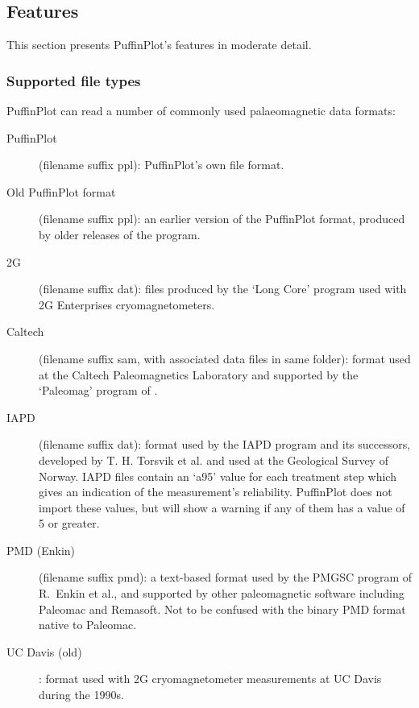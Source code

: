 \documentclass[a4paper,british]{article}
\newcommand{\ppcmd}[1]{\textsf{#1}} %
\newcommand{\caps}[1]{\MakeTextUppercase{#1}} %
\begin{document}
\subsection{Features}

This section presents PuffinPlot's features in moderate detail.

\subsubsection{\label{sec:file-types}Supported file types}

PuffinPlot can read a number of commonly used palaeomagnetic data
formats:

\begin{description}

\item[PuffinPlot] (filename suffix \ppcmd{ppl}): PuffinPlot's own file
  format.

\item[Old PuffinPlot format] (filename suffix \ppcmd{ppl}): an earlier
  version of the PuffinPlot format, produced by older releases of
  the program.

\item[2G] (filename suffix \ppcmd{dat}): files produced by the `Long
  Core' program used with 2G Enterprises cryomagnetometers.

\item[Caltech] (filename suffix \ppcmd{sam}, with associated data files
  in same folder): format used at the Caltech Paleomagnetics Laboratory
  and supported by the `Paleomag' program of \cite{jones2002paleomag}.

\item[IAPD] (filename suffix \ppcmd{dat}): format used by the
  \caps{iapd} program and its successors, developed by T. H. Torsvik et
  al. and used at the Geological Survey of Norway. IAPD files contain an
  `a95' value for each treatment step which gives an indication of the
  measurement's reliability. PuffinPlot does not import these values,
  but will show a warning if any of them has a value of 5 or greater.

\item[PMD (Enkin)] (filename suffix \ppcmd{pmd}): a text-based format
  used by the PMGSC program of R.~Enkin et al., and supported by other
  paleomagnetic software including Paleomac and Remasoft. Not to be
  confused with the binary PMD format native to Paleomac.
  
\item[UC Davis (old)]: format used with 2G cryomagnetometer measurements
  at UC Davis during the 1990s.
  

\end{description}
\end{document}
